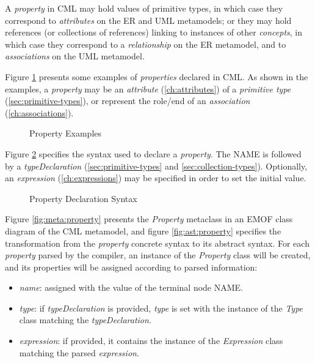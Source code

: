 A \emph{property} in CML may hold values of primitive types,
in which case they correspond to \emph{attributes}
on the ER \cite{er} and UML \cite{uml} metamodels;
or they may hold references (or collections of references)
linking to instances of other \emph{concepts},
in which case they correspond to a \emph{relationship} on the ER metamodel,
and to \emph{associations} on the UML metamodel.

\begin{examples}
Figure \ref{fig:ex:properties} presents some examples of \emph{properties} declared in CML.
As shown in the examples,
a \emph{property} may be an \emph{attribute} (\ref{ch:attributes})
of a \emph{primitive type} (\ref{sec:primitive-types}),
or represent the role/end of an \emph{association} (\ref{ch:associations}).
\end{examples}

\begin{figure}
\verbatimfont{\small}

\caption{Property Examples}
\label{fig:ex:properties}
\end{figure}

\begin{concrete-syntax}
Figure \ref{fig:stx:property} specifies the syntax used
to declare a \emph{property}.
The NAME is followed by a \emph{typeDeclaration}
(\ref{sec:primitive-types} and \ref{sec:collection-types}).
Optionally, an \emph{expression} (\ref{ch:expressions}) may be specified
in order to set the initial value.
\end{concrete-syntax}

\begin{figure}
\verbatimfont{\small}

\caption{Property Declaration Syntax}
\label{fig:stx:property}
\end{figure}

\begin{abstract-syntax}
Figure \ref{fig:meta:property} presents the \emph{Property} metaclass
in an EMOF \cite{mof} class diagram of the CML metamodel,
and figure \ref{fig:ast:property} specifies
the transformation
from the \emph{property} concrete syntax to its abstract syntax.
For each \emph{property} parsed by the compiler,
an instance of the \emph{Property} class will be created,
and its properties will be assigned
according to parsed information:

\begin{itemize}

\item \emph{name}:
assigned with the value of the terminal node NAME.

\item \emph{type}:
if \emph{typeDeclaration} is provided,
\emph{type} is set with the instance of the \emph{Type} class
matching the \emph{typeDeclaration}.

\item \emph{expression}:
if provided,
it contains the instance of the \emph{Expression} class
matching the parsed \emph{expression}.

\end{itemize}
\end{abstract-syntax}

